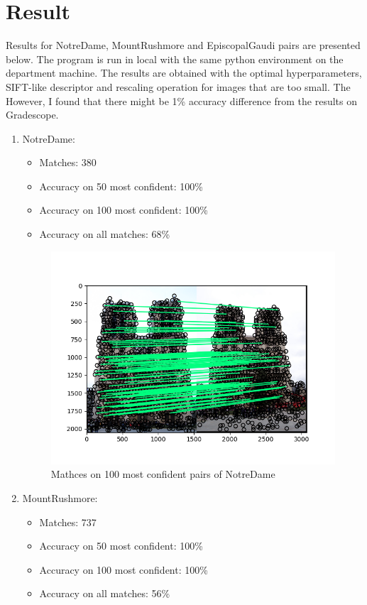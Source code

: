 \section*{Result}

Results for NotreDame, MountRushmore and EpiscopalGaudi pairs are presented below. The program is run in local with the same python environment on the department machine. The results are obtained with the optimal hyperparameters, SIFT-like descriptor and rescaling operation for images that are too small. The However, I found that there might be 1\% accuracy difference from the results on Gradescope.

\begin{enumerate}
    \item NotreDame:
    \begin{itemize}
        \item Matches: 380
        \item Accuracy on 50 most confident: 100\%
        \item Accuracy on 100 most confident: 100\%
        \item Accuracy on all matches: 68\%
    \end{itemize}
    
    \begin{figure}[htbp]
        \centering
        \includegraphics[scale=0.8]{../results/notre_dame_matches.png}
        \caption{Mathces on 100 most confident pairs of NotreDame}
        \label{notredame}
    \end{figure}

    \item MountRushmore:
    \begin{itemize}
        \item Matches: 737
        \item Accuracy on 50 most confident: 100\%
        \item Accuracy on 100 most confident: 100\%
        \item Accuracy on all matches: 56\%
    \end{itemize}
    

\end{enumerate}
